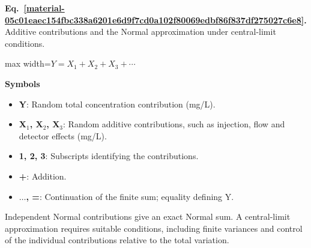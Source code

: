 \documentclass[11pt,a4paper]{article}
\begin{document}
\par\medskip
\begin{samepage}
\label{material-05c01eaec154fbc338a6201e6d9f7cd0a102f80069edbf86f837df275027c6e8}
\noindent\textbf{Eq.~\ref*{material-05c01eaec154fbc338a6201e6d9f7cd0a102f80069edbf86f837df275027c6e8}.} Additive contributions and the Normal approximation under central-limit conditions.\par\nopagebreak
\begin{center}\begin{adjustbox}{max width=\linewidth}$\displaystyle Y=X_1+X_2+X_3+\cdots$\end{adjustbox}\end{center}

\par\noindent\textbf{Symbols}

\begin{itemize}\setlength{\itemsep}{1pt}\setlength{\parsep}{0pt}
\item \textbf{Y}: Random total concentration contribution (mg/L).
\item \textbf{X\ensuremath{{}_1}, X\ensuremath{{}_2}, X\ensuremath{{}_3}}: Random additive contributions, such as injection, flow and detector effects (mg/L).
\item \textbf{1, 2, 3}: Subscripts identifying the contributions.
\item \textbf{+}: Addition.
\item \textbf{\ensuremath{\ldots}, =}: Continuation of the finite sum; equality defining Y.
\end{itemize}

Independent Normal contributions give an exact Normal sum. A central-limit approximation requires suitable conditions, including finite variances and control of the individual contributions relative to the total variation.

\end{samepage}
\medskip
\end{document}
